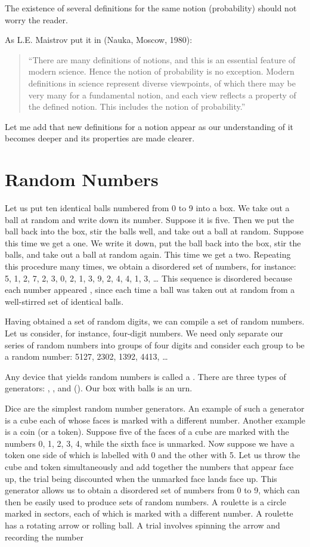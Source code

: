 The existence of several definitions for the same notion (probability)
should not worry the reader.

As L.E. Maistrov put it in  (Nauka, Moscow, 1980): 
\begin{quote}
  ``There are many definitions of 
notions, and this is an essential feature of modern science. Hence the
notion of probability is no exception. Modern definitions in science
represent diverse viewpoints, of which there may be very many for a
fundamental notion, and each view reflects a property of the defined
notion. This includes the notion of probability.'' 
\end{quote}
Let me add that new
definitions for a notion appear as our understanding of it becomes
deeper and its properties are made clearer.


\section{Random Numbers}
 Let us put ten identical balls numbered
from 0 to 9 into a box. We take out a ball at random and write down
its number. Suppose it is five. Then we put the ball back into the box,
stir the balls well, and take out a ball at random. Suppose this time we
get a one. We write it down, put the ball back into the box, stir the
balls, and take out a ball at random again. This time we get a two.
Repeating this procedure many times, we obtain a disordered set of
numbers, for instance: 5, 1, 2, 7, 2, 3, 0, 2, 1, 3, 9, 2, 4, 4, 1, 3, \ldots{} This sequence is disordered because each number appeared , since
each time a ball was taken out at random from a well-stirred set of
identical balls.


Having obtained a set of random digits, we can compile a set of
random numbers. Let us consider, for instance, four-digit numbers. We
need only separate our series of random numbers into groups of four
digits and consider each group to be a random number: 5127, 2302,
1392, 4413, \ldots{}

Any device that yields random numbers is called a . There are three types of generators: ,
, and  (). Our box with balls is an urn.

Dice are the simplest random number generators. An example of such
a generator is a cube each of whose faces is marked with a different
number. Another example is a coin (or a token). Suppose five of the
faces of a cube are marked with the numbers 0, 1, 2, 3, 4, while the sixth
face is unmarked. Now suppose we have a token one side of which is
labelled with 0 and the other with 5. Let us throw the cube and token
simultaneously and add together the numbers that appear face up, the
trial being discounted when the unmarked face lands face up. This
generator allows us to obtain a disordered set of numbers from 0 to 9,
which can then be easily used to produce sets of random numbers.
A roulette is a circle marked in sectors, each of which is marked with
a different number. A roulette has a rotating arrow or rolling ball.
A trial involves spinning the arrow and recording the number

